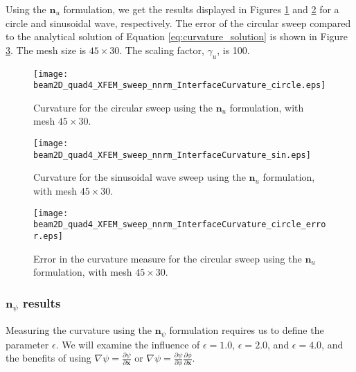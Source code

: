 Using the $\mathbf{n}_{u}$ formulation, we get the results displayed in Figures \ref{fig:beam2D_quad4_XFEM_sweep_nnrm_InterfaceCurvature_circle} and \ref{fig:beam2D_quad4_XFEM_sweep_nnrm_InterfaceCurvature_sin} for a circle and sinusoidal wave, respectively. The error of the circular sweep compared to the analytical solution of Equation \ref{eq:curvature_solution} is shown in Figure \ref{fig:beam2D_quad4_XFEM_sweep_nnrm_InterfaceCurvature_circle_error}. The mesh size is $45 \times 30$. The scaling factor, $\gamma_{u}$, is 100.
%
\begin{figure}[H]
	\centering
	\texttt{[image: beam2D\_quad4\_XFEM\_sweep\_nnrm\_InterfaceCurvature\_circle.eps]}
	\caption{Curvature for the circular sweep using the $\mathbf{n}_{u}$ formulation, with mesh $45 \times 30$.}
	\label{fig:beam2D_quad4_XFEM_sweep_nnrm_InterfaceCurvature_circle}
\end{figure}
%
\begin{figure}[H]
	\centering
	\texttt{[image: beam2D\_quad4\_XFEM\_sweep\_nnrm\_InterfaceCurvature\_sin.eps]}
	\caption{Curvature for the sinusoidal wave sweep using the $\mathbf{n}_{u}$ formulation, with mesh $45 \times 30$.}
	\label{fig:beam2D_quad4_XFEM_sweep_nnrm_InterfaceCurvature_sin}
\end{figure}
%
\begin{figure}[H]
	\centering
	\texttt{[image: beam2D\_quad4\_XFEM\_sweep\_nnrm\_InterfaceCurvature\_circle\_error.eps]}
	\caption{Error in the curvature measure for the circular sweep using the $\mathbf{n}_{u}$ formulation, with mesh $45 \times 30$.}
	\label{fig:beam2D_quad4_XFEM_sweep_nnrm_InterfaceCurvature_circle_error}
\end{figure}
%

\subsubsection{$\mathbf{n}_{\psi}$ results}
\label{sec:npsi_results}

Measuring the curvature using the $\mathbf{n}_{\psi}$ formulation requires us to define the parameter $\epsilon$. We will examine the influence of $\epsilon = 1.0$, $\epsilon = 2.0$, and $\epsilon = 4.0$, and the benefits of using $\nabla \psi = \frac{\partial \psi}{\partial \mathbf{x}}$ or 
$\nabla \psi = \frac{\partial \psi}{\partial \phi} \frac{\partial \phi}{\partial \mathbf{x}}$.


